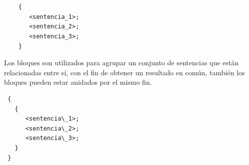 \documentclass[a4paper,12pt,spanish]{article}
\begin{document}
\begin{center}
  \begin{minipage}[H]{0.45\linewidth}
    \begin{tcolorbox}[title=''Bloques en C++'',
      colback=red!5!white,colframe=red!75!black,fonttitle=\bfseries]
\begin{verbatim}


    {  
       <sentencia_1>; 
       <sentencia_2>; 
       <sentencia_3>; 
    }

\end{verbatim}
    \end{tcolorbox}
  \end{minipage}
\end{center}
Los bloques son utilizados para agrupar un conjunto de sentencias que
están relacionadas entre sí, con el fin de obtener  un resultado en
común, también los bloques pueden estar anidados por el mismo fin.

\begin{center}
  \begin{minipage}[H]{0.45\linewidth}
    \begin{tcolorbox}[title=''Bloques anidado C++'',
      colback=red!5!white,colframe=red!75!black,fonttitle=\bfseries]

\begin{verbatim}
 {
   {  
      <sentencia\_1>; 
      <sentencia\_2>; 
      <sentencia\_3>; 
   }
 }
\end{verbatim}
    \end{tcolorbox}
  \end{minipage}
\end{center}
\end{document}
